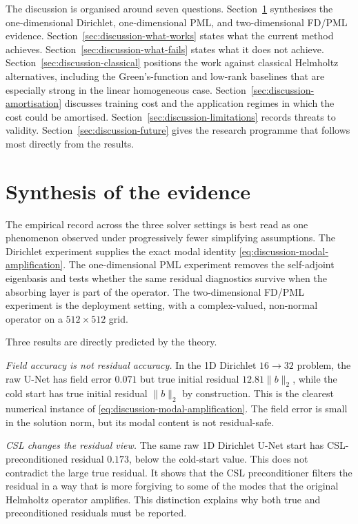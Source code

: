The discussion is organised around seven questions. Section~\ref{sec:discussion-synthesis}
synthesises the one-dimensional Dirichlet, one-dimensional PML, and
two-dimensional FD/PML evidence. Section~\ref{sec:discussion-what-works}
states what the current method achieves. Section~\ref{sec:discussion-what-fails}
states what it does not achieve. Section~\ref{sec:discussion-classical}
positions the work against classical Helmholtz alternatives, including the
Green's-function and low-rank baselines that are especially strong in the
linear homogeneous case. Section~\ref{sec:discussion-amortisation} discusses
training cost and the application regimes in which the cost could be
amortised. Section~\ref{sec:discussion-limitations} records threats to
validity. Section~\ref{sec:discussion-future} gives the research programme
that follows most directly from the results.

\section{Synthesis of the evidence}
\label{sec:discussion-synthesis}

The empirical record across the three solver settings is best read as one
phenomenon observed under progressively fewer simplifying assumptions. The
Dirichlet experiment supplies the exact modal identity
\eqref{eq:discussion-modal-amplification}. The one-dimensional PML experiment
removes the self-adjoint eigenbasis and tests whether the same residual
diagnostics survive when the absorbing layer is part of the operator. The
two-dimensional FD/PML experiment is the deployment setting, with a
complex-valued, non-normal operator on a $512\times512$ grid.

Three results are directly predicted by the theory.

\textit{Field accuracy is not residual accuracy.} In the 1D Dirichlet
$16\to32$ problem, the raw U-Net has field error $0.071$ but true initial
residual $12.81\|b\|_2$, while the cold start has true initial residual
$\|b\|_2$ by construction. This is the clearest numerical instance of
\eqref{eq:discussion-modal-amplification}. The field error is small in the
solution norm, but its modal content is not residual-safe.

\textit{CSL changes the residual view.} The same raw 1D Dirichlet U-Net start
has CSL-preconditioned residual $0.173$, below the cold-start value. This does
not contradict the large true residual. It shows that the CSL preconditioner
filters the residual in a way that is more forgiving to some of the modes that
the original Helmholtz operator amplifies. This distinction explains why both
true and preconditioned residuals must be reported.

